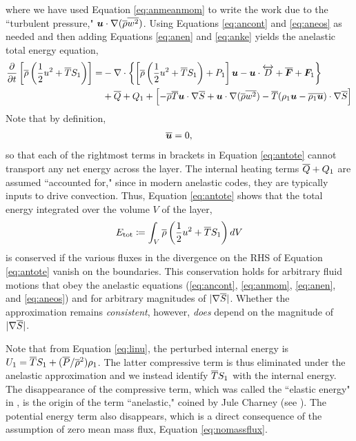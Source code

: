 \documentclass[12pt]{article}
\newcommand{\vecf}{\bm{F}}
\begin{document}
where we have used Equation \eqref{eq:anmeanmom} to write the work due to the ``turbulent pressure," $\bm{u}\cdot\nabla (\overline{\rho} \overline{w^2})$. 
Using Equations \eqref{eq:ancont} and \eqref{eq:aneos} as needed and then adding Equations \eqref{eq:anen} and \eqref{eq:anke} yields the anelastic total energy equation,
\begin{align}\label{eq:antote}
			\pderiv{}{t}\left[\rhoref\left(\frac{1}{2} u^2 + \tmpref S_1\right)\right] = &-\Div\left\{\left[\rhoref\left(\frac{1}{2} u^2 + \tmpref S_1\right) + P_1\right]\vecu- \vecu\cdot\overleftrightarrow{D} + \overline{\vecf} + \vecf_1\right\}\nonumber\\
			 &+ \qref + Q_1 +\left[-\rhoref\tmpref\ugrad\sref +\ugrad (\rhoref \overline{w^2})- \tmpref(\rho_1\vecu-\overline{\rho_1\vecu})\cdot\nabla\sref\right]
\end{align}
Note that by definition, 
\begin{align}\label{eq:nomeanu}
	\overline{\bm{u}}=0,
\end{align}
so that each of the rightmost terms in brackets in Equation \eqref{eq:antote} cannot transport any net energy across the layer. The internal heating terms $\overline{Q} + Q_1$ are assumed ``accounted for," since in modern anelastic codes, they are typically inputs to drive convection. Thus, Equation \eqref{eq:antote} shows that the total energy integrated over the volume $V$ of the layer,
\begin{align}
	E_{\rm tot} \coloneqq \int_V \overline{\rho}\left(\frac{1}{2} u^2 + \overline{T} S_1\right) dV
\end{align}
is conserved if the various fluxes in the divergence on the RHS of Equation \eqref{eq:antote} vanish on the boundaries. This conservation holds for arbitrary fluid motions that obey the anelastic equations (\eqref{eq:ancont}, \eqref{eq:anmom}, \eqref{eq:anen}, and \eqref{eq:aneos}) and for arbitrary magnitudes of $|\nabla \overline{S}|$. Whether the approximation remains \textit{consistent}, however, \textit{does} depend on the magnitude of $|\nabla\overline{S}|$.

Note that from Equation \eqref{eq:linu}, the perturbed internal energy is $U_1 = \overline{T} S_1 + (\overline{P}/\overline{\rho}^2)\rho_1$. The latter compressive term is thus eliminated under the anelastic approximation and we instead identify $\overline{T} S_1$ with the internal energy. The disappearance of the compressive term, which was called the ``elastic energy" in \citet{Eckart1956}, is the origin of the term ``anelastic," coined by Jule Charney (see \citealt{Ogura1962}). The potential energy term also disappears, which is a direct consequence of the assumption of zero mean mass flux, Equation \eqref{eq:nomassflux}. 
\end{document}
